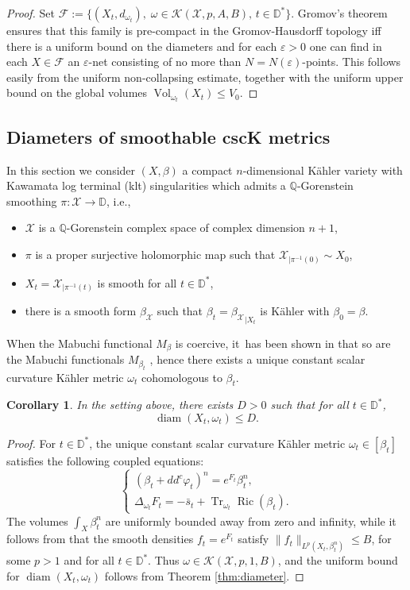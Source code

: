 \documentclass[11pt]{article}
\newcommand{\ie}{i.e.,\xspace}
\numberwithin{equation}{section}
\DeclareMathOperator{\diam}{diam}
\DeclareMathOperator{\Ric}{Ric}
\DeclareMathOperator{\Tr}{Tr}
\DeclareMathOperator{\Vol}{Vol}
\newtheorem{coro}[theorem]{Corollary}
\theoremstyle{definition}
\newcommand{\D}{\mathbb D}
\newcommand{\Q}{\mathbb Q}
\let\e\varepsilon
\begin{document}
\begin{proof}
Set ${\mathcal F}:=\{ (X_t,d_{\omega_t}), \; \omega \in {\mathcal K}(\mathcal{X},p,A,B), \, t \in \D^* \}$.
Gromov's theorem \cite[Th.\,7.4.15]{BBI01} ensures that this family is pre-compact in the Gromov-Hausdorff
topology iff there is a uniform bound on the diameters and for each $\e>0$
one can find in each $X \in {\mathcal F}$ an $\e$-net consisting of no more than
$N=N(\e)$-points. This follows easily from the uniform non-collapsing estimate, together
with the uniform upper bound on the global volumes $\Vol_{\omega_t}(X_t) \leq V_0$.
\end{proof}

\subsection{Diameters of smoothable cscK metrics} \label{sec:csck}

In this section we consider $(X,\beta)$ a compact $n$-dimensional Kähler variety with Kawamata log terminal (klt) singularities
which admits a $\Q$-Gorenstein smoothing
$\pi: {\mathcal X} \rightarrow \D$, \ie
\begin{itemize}
\item ${\mathcal X}$ is a $\Q$-Gorenstein complex space of complex dimension $n+1$,
\item $\pi$ is a proper surjective holomorphic map such that ${\mathcal X}_{|\pi^{-1}(0)} \sim X_0$,
\item $X_t={\mathcal X}_{|\pi^{-1}(t)}$ is smooth for all $t \in \D^*$,
\item there is a smooth form $\beta_{{\mathcal X}}$ such that
$\beta_t={\beta_{{\mathcal X}}}_{|X_t}$ is Kähler with $\beta_0=\beta$.
\end{itemize}

When the Mabuchi functional $M_{\beta}$ is coercive, it~has been shown in \cite[Th.\,C]{PTT23} that
so are the Mabuchi functionals $M_{\beta_t}$ , hence
there exists a unique constant scalar curvature Kähler metric $\omega_t$ cohomologous to $\beta_t$.

\begin{coro} \label{cor:csck}
In the setting above, there exists $D>0$ such that for all $t \in \D^*$,
\[
\diam(X_t,\omega_t) \leq D.
\]
\end{coro}

\begin{proof}
For $t\in \mathbb{D}^* $, the unique constant scalar curvature Kähler metric $\omega_t\in [\beta_t]$
satisfies the following coupled equations:
\[
\begin{cases}
(\beta_t+ dd^c \varphi_t)^n = e^{F_t} \beta_t^n, \\
\Delta_{\omega_t} F_t= -\bar s_t + \Tr_{\omega_t} \Ric(\beta_t).
\end{cases}
\]
The volumes $\int_X \beta_t^n$ are uniformly bounded away from zero and infinity, while
it follows from \cite[Th.\,5.3]{PTT23} that
the smooth densities $f_t\!=\!e^{F_t}$
satisfy \hbox{$\|f_t\|_{L^p(X_t, \beta_t^n)} \!\leq\! B$}, for some $p>1$ and for all $t\in \mathbb{D}^*$.
Thus $\omega\in {\mathcal K}(\mathcal{X},p,1,B)$, and the uniform bound for $\diam(X_t, \omega_t) $ follows from Theorem \ref{thm:diameter}.
\end{proof}
\end{document}
